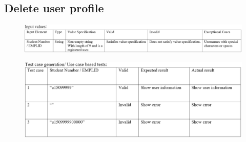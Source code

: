 \documentclass[english]{article}
\begin{document}
\subsection{Delete user profile}
\begin{figure}[ht!]
\hspace*{-2.5cm} 
\includegraphics[width=180mm]{12.png}
\end{figure}
\begin{figure}[ht!]
\hspace*{-2.5cm} 
\includegraphics[width=180mm]{ViewTestCase.png}
\end{figure}
\clearpage
\end{document}
